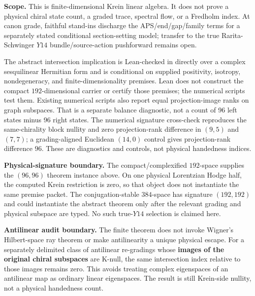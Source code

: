 \documentclass[11pt]{article}
\theoremstyle{remark}
\begin{document}
\textbf{Scope.} This is finite-dimensional Krein linear algebra. It does not prove a physical chiral state count, a graded trace, spectral flow, or a Fredholm index. At canon grade, faithful stand-ins discharge the APS/end/gap/family terms for a separately stated conditional section-setting model; transfer to the true Rarita-Schwinger $Y14$ bundle/source-action pushforward remains open.

The abstract intersection implication is Lean-checked in  directly over a complex sesquilinear Hermitian form and is conditional on supplied positivity, isotropy, nondegeneracy, and finite-dimensionality premises. Lean does not construct the compact $192$-dimensional carrier or certify those premises; the numerical scripts test them. Existing numerical scripts also report equal projection-image ranks on graph subspaces. That is a separate balance diagnostic, not a count of 96 left states minus 96 right states. The numerical signature cross-check reproduces the same-chirality block nullity and zero projection-rank difference in $(9,5)$ and $(7,7)$; a grading-aligned Euclidean $(14,0)$ control gives projection-rank difference $96$. These are diagnostics and controls, not physical handedness indices.

\textbf{Physical-signature boundary.} The compact/complexified $192$-space supplies the $(96,96)$ theorem instance above. On one physical Lorentzian Hodge half, the computed Krein restriction is zero, so that object does not instantiate the same premise packet. The conjugation-stable $384$-space has signature $(192,192)$ and could instantiate the abstract theorem only after the relevant grading and physical subspace are typed. No such true-$Y14$ selection is claimed here.

\textbf{Antilinear audit boundary.} The finite theorem does not invoke Wigner's Hilbert-space ray theorem or make antilinearity a unique physical escape. For a separately delimited class of antilinear re-gradings whose \textbf{images of the original chiral subspaces} are K-null, the same intersection index relative to those images remains zero. This avoids treating complex eigenspaces of an antilinear map as ordinary linear eigenspaces. The result is still Krein-side nullity, not a physical handedness count.
\end{document}

